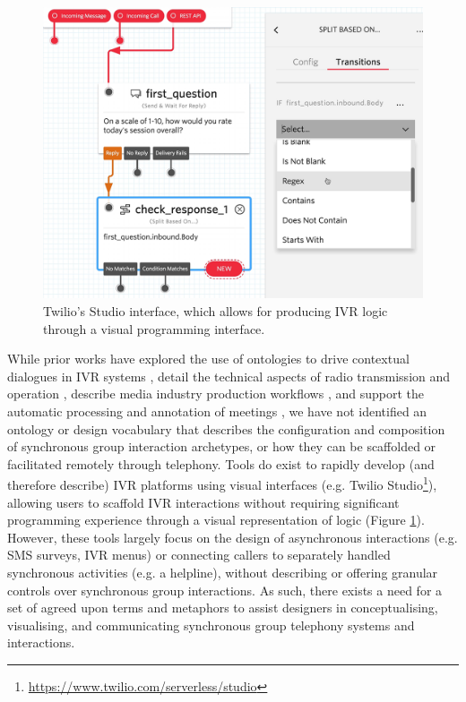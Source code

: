 \begin{figure}[h]
  \centering
  \includegraphics[width=0.6\linewidth]{images/twilio.png}
  \caption{Twilio's Studio interface, which allows for producing IVR logic through a visual programming interface.}
  \label{fig:twilio}
\end{figure}

While prior works have explored the use of ontologies to drive contextual dialogues in IVR systems \cite{ababneh2013, thirumaran2015, thirumaran2015a}, detail the technical aspects of radio transmission and operation \cite{ihmcIHMCOntology}, describe media industry production workflows \cite{movielabs2021}, and support the automatic processing and annotation of meetings \cite{niekrasz2006}, we have not identified an ontology or design vocabulary that describes the configuration and composition of synchronous group interaction archetypes, or how they can be scaffolded or facilitated remotely through telephony. Tools do exist to rapidly develop (and therefore describe) IVR platforms using visual interfaces (e.g. Twilio Studio\footnote{\url{https://www.twilio.com/serverless/studio}}), allowing users to scaffold IVR interactions without requiring significant programming experience through a visual representation of logic (Figure \ref{fig:twilio}). However, these tools largely focus on the design of asynchronous interactions (e.g. SMS surveys, IVR menus) or connecting callers to separately handled synchronous activities (e.g. a helpline), without describing or offering granular controls over synchronous group interactions. As such, there exists a need for a set of agreed upon terms and metaphors to assist designers in conceptualising, visualising, and communicating synchronous group telephony systems and interactions.